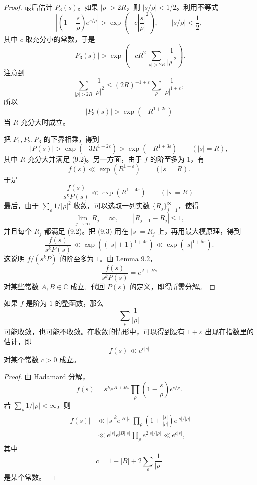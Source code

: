 \begin{proof}
	最后估计 $P_3(s)$。如果 $|\rho|>2R$，则 $|s/\rho|<1/2$。利用不等式
	\[
		\left|\left(1-\frac{s}{\rho}\right)e^{s/\rho}\right|
		>
		\exp\left(-c\left|\frac{s}{\rho}\right|^2\right),
		\qquad |s/\rho|<\frac12,
	\]
	其中 $c$ 取充分小的常数，于是
	\[
		|P_3(s)|
		>
		\exp\left(
		-cR^2\sum_{|\rho|>2R}\frac1{|\rho|^2}
		\right).
	\]
	注意到
	\[
		\sum_{|\rho|>2R}\frac1{|\rho|^2}
		\leq
		(2R)^{-1+\varepsilon}
		\sum_\rho\frac1{|\rho|^{1+\varepsilon}},
	\]
	所以
	\[
		|P_3(s)|
		>
		\exp(-R^{1+2\varepsilon})
	\]
	当 $R$ 充分大时成立。

	把 $P_1,P_2,P_3$ 的下界相乘，得到
	\[
		|P(s)|>\exp(-3R^{1+2\varepsilon})
		>
		\exp(-R^{1+3\varepsilon})
		\qquad (|s|=R),
	\]
	其中 $R$ 充分大并满足 (9.2)。另一方面，由于 $f$ 的阶至多为 $1$，有
	\[
		f(s)\ll \exp(R^{1+\varepsilon})
		\qquad (|s|=R).
	\]
	于是
	\begin{equation}
		\frac{f(s)}{s^kP(s)}
		\ll
		\exp(R^{1+4\varepsilon})
		\qquad (|s|=R).
	\tag{9.3}
	\end{equation}
	最后，由于 $\sum_\rho 1/|\rho|^2$ 收敛，可以选取一列实数 $\{R_j\}_{j=1}^{\infty}$，使得
	\[
		\lim_{j\to\infty}R_j=\infty,
		\qquad
		|R_{j+1}-R_j|\leq1,
	\]
	并且每个 $R_j$ 都满足 (9.2)。把 (9.3) 用在 $|s|=R_j$ 上，再用最大模原理，得到
	\[
		\frac{f(s)}{s^kP(s)}
		\ll
		\exp\left((|s|+1)^{1+4\varepsilon}\right)
		\ll
		\exp(|s|^{1+5\varepsilon}).
	\]
	这说明 $f/(s^kP)$ 的阶至多为 $1$。由 Lemma 9.2，
	\[
		\frac{f(s)}{s^kP(s)}=e^{A+Bs}
	\]
	对某些常数 $A,B\in\mathbb C$ 成立。代回 $P(s)$ 的定义，即得所需分解。
\end{proof}

\begin{remark}
	如果 $f$ 是阶为 $1$ 的整函数，那么
	\[
		\sum_\rho \frac1{|\rho|}
	\]
	可能收敛，也可能不收敛。在收敛的情形中，可以得到没有 $1+\varepsilon$ 出现在指数里的估计，即
	\[
		f(s)\ll e^{c|s|}
	\]
	对某个常数 $c>0$ 成立。
\end{remark}

\begin{proof}
	由 Hadamard 分解，
	\[
		f(s)=s^k e^{A+Bs}
		\prod_\rho
		\left(1-\frac{s}{\rho}\right)e^{s/\rho}.
	\]
	若 $\sum_\rho 1/|\rho|<\infty$，则
	\[
	\begin{aligned}
		|f(s)|
		&\ll
		|s|^k e^{|B||s|}
		\prod_\rho
		\left(1+\frac{|s|}{|\rho|}\right)e^{|s|/|\rho|} \\
		&\ll
		e^{|s|}e^{|B||s|}
		\prod_\rho e^{2|s|/|\rho|}
		\ll
		e^{c|s|},
	\end{aligned}
	\]
	其中
	\[
		c=1+|B|+2\sum_\rho\frac1{|\rho|}
	\]
	是某个常数。
\end{proof}


